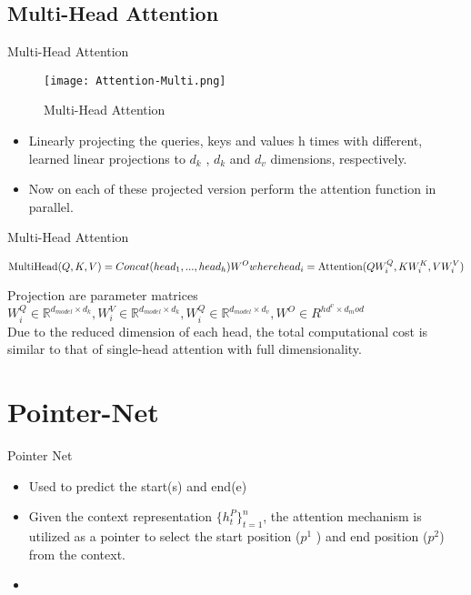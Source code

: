 \documentclass[10pt]{beamer}
\begin{document}
\subsection{Multi-Head Attention}

\begin{frame}{Multi-Head Attention}
	\begin{figure}[ht!]
		\centering
		\texttt{[image: Attention-Multi.png]}
		\caption{Multi-Head Attention }
		\label{fig:multi-attention}
	\end{figure}
	\vspace{-20}
	\begin{itemize}
		\item Linearly projecting the queries, keys and values h times with different, learned linear projections to $d_k$ , $d_k$ and $d_v$ dimensions, respectively.
		\item Now on each of these projected version perform the attention function in parallel.
	\end{itemize}
\end{frame}

\begin{frame}{Multi-Head Attention}
	\begin{center}
		\[
			\text {MultiHead}(Q, K, V) = Concat(head_1, ...,head_h)W^O\\
			where head_i = \text{Attention}(QW_i^Q, KW_i^K,VW_i^V)
		\]
	\end{center}
	Projection are parameter matrices $W_i^Q \in \mathbb{R}^{d_{model} \times d_k}, W_i^V \in \mathbb{R}^{d_{model}\times d_k}, W_i^Q \in \mathbb{R}^{d_{model} \times d_v}, W^O \in R^{{hd^v} \times d_mod}  $\\
	Due to the reduced dimension of each head, the total computational cost is similar to that of single-head attention with full dimensionality.
\end{frame}
\section{Pointer-Net}
\begin{frame}{Pointer Net}
	\begin{itemize}
		\item Used to predict the start(s) and end(e)
		\item Given the context representation $\{h_t^P\}_{t = 1}^n$, the attention mechanism is utilized as a pointer to select the start position ($p^1$ ) and end position ($p^2 $) from the context.
		\item
	\end{itemize}

\end{frame}
\end{document}
